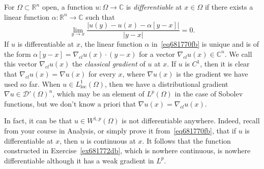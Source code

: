 \documentclass[a4paper,9pt]{amsart}
\newcommand{\scr}[1]{\mathscr{#1}}
\newcommand{\R}{\mathbb{R}}	%
\newcommand{\C}{\mathbb{C}}	%
\newcommand{\loc}{\mathrm{loc}}
\newcommand{\grad}{\nabla}
\theoremstyle{plain}
\theoremstyle{definition}
\theoremstyle{remark}
\begin{document}
For $\Omega\subset\R^n$ open, a function $u:\Omega\to\C$ is \emph{differentiable} at $x\in \Omega$ if there exists a linear function $\alpha:\R^n\to\C$ such that
\begin{equation}\label{eq681770fb}
	\lim_{y\to x} \frac{ |u(y)-u(x) - \alpha[y-x]| }{ |y-x| } = 0 .
\end{equation}
If $u$ is differentiable at $x$, the linear function $\alpha$ in~\eqref{eq681770fb} is unique and is of the form $\alpha[y-x] = \grad_{cl} u(x)\cdot(y-x)$ for a vector $\grad_{cl} u(x)\in \C^n$.
We call this vector $\grad_{cl} u(x)$ the \emph{classical gradient} of $u$ at $x$.
If $u$ is $C^1$, then it is clear that $\grad_{cl} u(x)=\grad u(x)$ for every $x$, where $\grad u(x)$ is the gradient we have used so far.
When $u\in L^1_\loc(\Omega)$, then we have a distributional gradient $\grad u \in \scr D'(\Omega)^n$, which may be an element of $L^p(\Omega)$ in the case of Sobolev functions,
but we don't know a priori that $\grad u(x) = \grad_{cl} u(x)$.

In fact, it can be that $u\in W^{1,p}(\Omega)$ is not differentiable anywhere.
Indeed, recall from your course in Analysis, or simply prove it from~\eqref{eq681770fb}, 
that if $u$ is differentiable at $x$, then $u$ is continuous at $x$.
It follows that the function constructed in Exercise~\ref{ex681772db}, which is nowhere continuous, is nowhere differentiable although it has a weak gradient in $L^p$.
\end{document}
